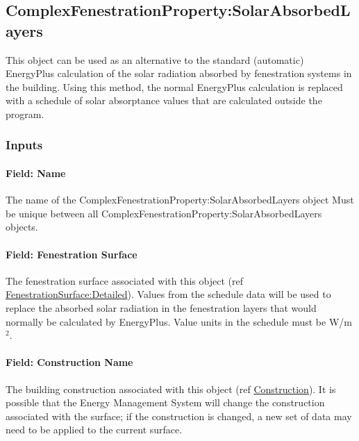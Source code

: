 \subsection{ComplexFenestrationProperty:SolarAbsorbedLayers}\label{complexfenestrationpropertysolarabsorbedlayers}

This object can be used as an alternative to the standard (automatic) EnergyPlus calculation of the solar radiation absorbed by fenestration systems in the building. Using this method, the normal EnergyPlus calculation is replaced with a schedule of solar absorptance values that are calculated outside the program.

\subsubsection{Inputs}\label{inputs-15}

\paragraph{Field: Name}\label{field-name-11}

The name of the ComplexFenestrationProperty:SolarAbsorbedLayers object Must be unique between all ComplexFenestrationProperty:SolarAbsorbedLayers objects.

\paragraph{Field: Fenestration Surface}\label{field-fenestration-surface}

The fenestration surface associated with this object (ref \hyperref[fenestrationsurfacedetailed]{FenestrationSurface:Detailed}). Values from the schedule data will be used to replace the absorbed solar radiation in the fenestration layers that would normally be calculated by EnergyPlus. Value units in the schedule must be W/m\(^{2}\).

\paragraph{Field: Construction Name}\label{field-construction-name-2}

The building construction associated with this object (ref \hyperref[construction-000]{Construction}). It is possible that the Energy Management System will change the construction associated with the surface; if the construction is changed, a new set of data may need to be applied to the current surface.

